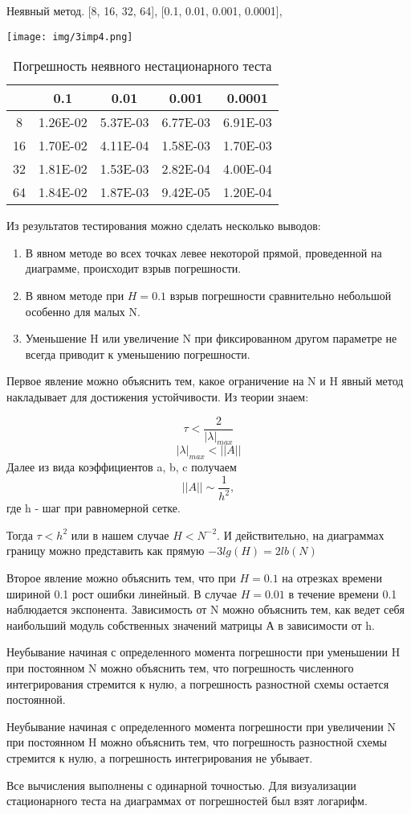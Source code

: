 Неявный метод.
[8, 16, 32, 64],
[0.1, 0.01, 0.001, 0.0001],
\begin{center}
  \texttt{[image: img/3imp4.png]}
\end{center}
\begin{table}[H]
  \centering
  \begin{tabular}{c | c | c | c | c}
    \toprule
  & 0.1 & 0.01 & 0.001 & 0.0001 \\ 
\midrule
8 & 1.26E-02 & 5.37E-03 & 6.77E-03 & 6.91E-03 \\ 
16 & 1.70E-02 & 4.11E-04 & 1.58E-03 & 1.70E-03 \\ 
32 & 1.81E-02 & 1.53E-03 & 2.82E-04 & 4.00E-04 \\ 
64 & 1.84E-02 & 1.87E-03 & 9.42E-05 & 1.20E-04 \\ 
    \bottomrule
  \end{tabular}
  \caption{Погрешность неявного нестационарного теста}
\end{table}

Из результатов тестирования можно сделать несколько выводов:
\begin{enumerate}
  \item В явном методе во всех точках левее некоторой прямой, проведенной на диаграмме, происходит взрыв погрешности.
  \item В явном методе при $H = 0.1$ взрыв погрешности сравнительно небольшой особенно для малых N.
  \item Уменьшение H или увеличение N при фиксированном другом параметре не всегда приводит к уменьшению погрешности.
\end{enumerate}

Первое явление можно объяснить тем, какое ограничение на N и H явный метод накладывает для достижения устойчивости. Из теории знаем:

\[ \tau < \frac{2}{|\lambda|_{max}} \]
\[ |\lambda|_{max} < ||A|| \]
Далее из вида коэффициентов a, b, c получаем
\[ ||A|| \sim \frac{1}{h^2},\]
где h - шаг при равномерной сетке.

Тогда $\tau < h^2$ или в нашем случае $H < N^{-2}$. И действительно, на диаграммах границу можно представить как прямую $-3lg(H) = 2lb(N)$

Второе явление можно объяснить тем, что при $H = 0.1$ на отрезках времени шириной 0.1 рост ошибки линейный. В случае $H = 0.01$ в течение времени 0.1 наблюдается экспонента. Зависимость от N можно объяснить тем, как ведет себя наибольший модуль собственных значений матрицы А в зависимости от h.

Неубывание начиная с определенного момента погрешности при уменьшении H при постоянном N можно объяснить тем, что погрешность численного интегрирования стремится к нулю, а погрешность разностной схемы остается постоянной.

Неубывание начиная с определенного момента погрешности при увеличении N при постоянном H можно объяснить тем, что погрешность разностной схемы стремится к нулю, а погрешность интегрирования не убывает.

Все вычисления выполнены с одинарной точностью.
Для визуализации стационарного теста на диаграммах от погрешностей был взят логарифм.
